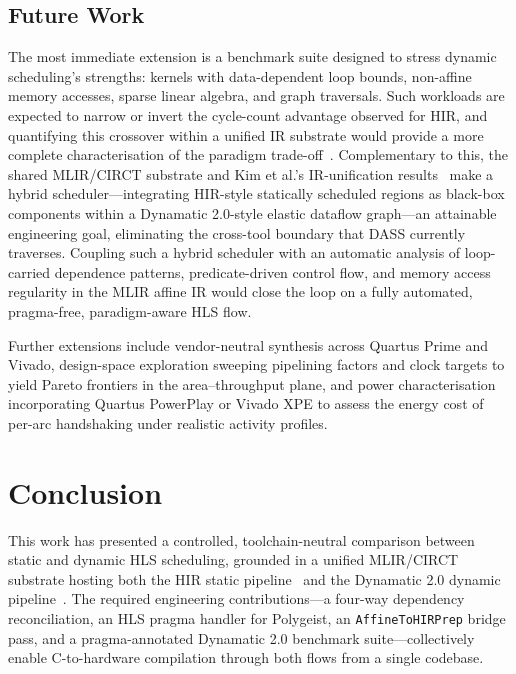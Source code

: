 \documentclass[sigplan,10pt,review,nonacm]{acmart}
\begin{document}
\subsection{Future Work}
\label{sec:future-work}

The most immediate extension is a benchmark suite designed to stress
dynamic scheduling's strengths: kernels with data-dependent loop bounds,
non-affine memory accesses, sparse linear algebra, and graph traversals.
Such workloads are expected to narrow or invert the cycle-count
advantage observed for HIR, and quantifying this crossover within a
unified IR substrate would provide a more complete characterisation of
the paradigm trade-off~\cite{9378784}. Complementary to this, the
shared MLIR/CIRCT substrate and Kim et al.'s IR-unification
results~\cite{10.1145/3689790} make a hybrid scheduler---integrating
HIR-style statically scheduled regions as black-box components within a
Dynamatic 2.0-style elastic dataflow graph---an attainable engineering goal,
eliminating the cross-tool boundary that DASS currently traverses.
Coupling such a hybrid scheduler with an automatic analysis of
loop-carried dependence patterns, predicate-driven control flow, and
memory access regularity in the MLIR affine IR would close the loop on
a fully automated, pragma-free, paradigm-aware HLS flow.

Further extensions include vendor-neutral synthesis across Quartus Prime
and Vivado, design-space exploration sweeping pipelining factors and
clock targets to yield Pareto frontiers in the area--throughput plane,
and power characterisation incorporating Quartus PowerPlay or Vivado XPE
to assess the energy cost of per-arc handshaking under realistic
activity profiles.

\section{Conclusion}

This work has presented a controlled, toolchain-neutral comparison
between static and dynamic HLS scheduling, grounded in a unified
MLIR/CIRCT substrate hosting both the HIR static
pipeline~\cite{10.1145/3623278.3624767} and the Dynamatic 2.0 dynamic
pipeline~\cite{10.1145/3373087.3375391}. The required engineering
contributions---a four-way dependency reconciliation, an HLS pragma
handler for Polygeist, an \texttt{AffineToHIRPrep} bridge pass, and a
pragma-annotated Dynamatic 2.0 benchmark suite---collectively enable
C-to-hardware compilation through both flows from a single codebase.
\end{document}
